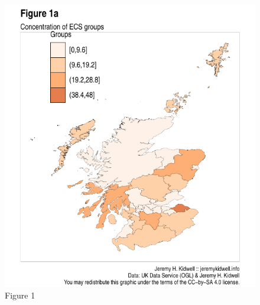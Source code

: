\documentclass[11pt,]{article}
\begin{document}
\begin{figure}
\centering
\includegraphics{figures/plot_admin_ecs_choropleth-1.pdf}
\caption{Figure 1}
\end{figure}
\end{document}
